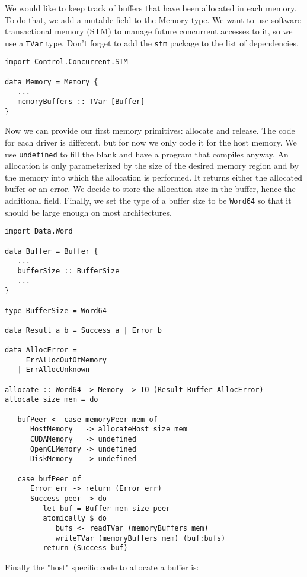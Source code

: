 We would like to keep track of buffers that have been allocated in each memory.
To do that, we add a mutable field to the Memory type. We want to use software
transactional memory (STM) to manage future concurrent accesses to it, so we use
a \texttt{TVar} type. Don't forget to add the \texttt{stm} package to the list
of dependencies.

\begin{lstlisting}
import Control.Concurrent.STM

data Memory = Memory {
   ...
   memoryBuffers :: TVar [Buffer]
}
\end{lstlisting}

Now we can provide our first memory primitives: allocate and release. The code
for each driver is different, but for now we only code it for the host memory.
We use \texttt{undefined} to fill the blank and have a program that compiles
anyway. An allocation is only parameterized by the size of the desired memory
region and by the memory into which the allocation is performed. It returns
either the allocated buffer or an error. We decide to store the allocation size
in the buffer, hence the additional field. Finally, we set the type of a buffer
size to be \texttt{Word64} so that it should be large enough on most
architectures.

\begin{lstlisting}
import Data.Word

data Buffer = Buffer {
   ...
   bufferSize :: BufferSize
   ...
}

type BufferSize = Word64

data Result a b = Success a | Error b

data AllocError = 
     ErrAllocOutOfMemory
   | ErrAllocUnknown

allocate :: Word64 -> Memory -> IO (Result Buffer AllocError)
allocate size mem = do

   bufPeer <- case memoryPeer mem of
      HostMemory   -> allocateHost size mem
      CUDAMemory   -> undefined
      OpenCLMemory -> undefined
      DiskMemory   -> undefined

   case bufPeer of
      Error err -> return (Error err)
      Success peer -> do
         let buf = Buffer mem size peer
         atomically $ do
            bufs <- readTVar (memoryBuffers mem)
            writeTVar (memoryBuffers mem) (buf:bufs)
         return (Success buf)
\end{lstlisting}

Finally the "host" specific code to allocate a buffer is:

